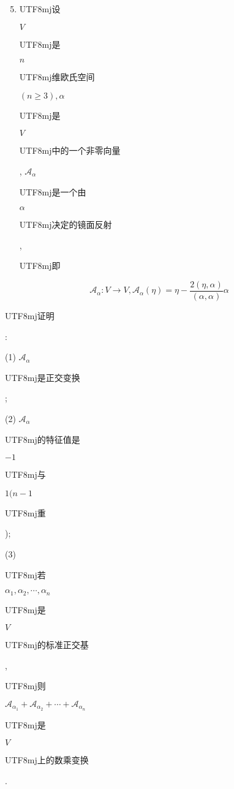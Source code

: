 \documentclass[10pt]{article}
\begin{document}
\begin{enumerate}
  \setcounter{enumi}{4}
  \item \begin{CJK}{UTF8}{mj}设\end{CJK} $V$ \begin{CJK}{UTF8}{mj}是\end{CJK} $n$ \begin{CJK}{UTF8}{mj}维欧氏空间\end{CJK} $(n \geqslant 3), \alpha$ \begin{CJK}{UTF8}{mj}是\end{CJK} $V$ \begin{CJK}{UTF8}{mj}中的一个非零向量\end{CJK}, $\mathscr{A}_{\alpha}$ \begin{CJK}{UTF8}{mj}是一个由\end{CJK} $\alpha$ \begin{CJK}{UTF8}{mj}决定的镜面反射\end{CJK}, \begin{CJK}{UTF8}{mj}即\end{CJK}
\end{enumerate}
$$
\mathscr{A}_{\alpha}: V \rightarrow V, \mathscr{A}_{\alpha}(\eta)=\eta-\frac{2(\eta, \alpha)}{(\alpha, \alpha)} \alpha
$$
\begin{CJK}{UTF8}{mj}证明\end{CJK}:

(1) $\mathscr{A}_{\alpha}$ \begin{CJK}{UTF8}{mj}是正交变换\end{CJK};

(2) $\mathscr{A}_{\alpha}$ \begin{CJK}{UTF8}{mj}的特征值是\end{CJK} $-1$ \begin{CJK}{UTF8}{mj}与\end{CJK} $1(n-1$ \begin{CJK}{UTF8}{mj}重\end{CJK});

(3) \begin{CJK}{UTF8}{mj}若\end{CJK} $\alpha_{1}, \alpha_{2}, \cdots, \alpha_{n}$ \begin{CJK}{UTF8}{mj}是\end{CJK} $V$ \begin{CJK}{UTF8}{mj}的标准正交基\end{CJK}, \begin{CJK}{UTF8}{mj}则\end{CJK} $\mathscr{A}_{\alpha_{1}}+\mathscr{A}_{\alpha_{2}}+\cdots+\mathscr{A}_{\alpha_{n}}$ \begin{CJK}{UTF8}{mj}是\end{CJK} $V$ \begin{CJK}{UTF8}{mj}上的数乘变换\end{CJK}.
\end{document}
